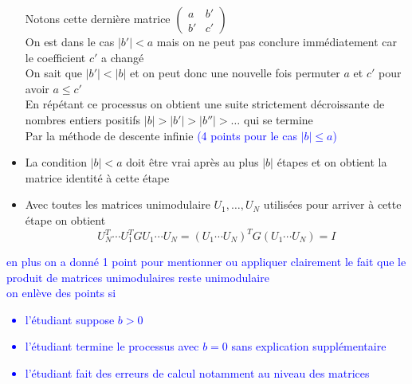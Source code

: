 \documentclass[11pt, a4paper, oneside]{article}
\newcommand{\indice}[1]{{\scriptsize \color{RubineRed} {#1}}}
\begin{document}
\begin{itemize}
Notons cette dernière matrice $\begin{pmatrix} a & b' \\ b' & c' \end{pmatrix}$ \\
\indice{On est dans le cas $|b'|<a$ mais on ne peut pas conclure immédiatement car le coefficient $c'$ a changé} \\
On sait que $|b'|<|b|$ et on peut donc une nouvelle fois permuter $a$ et $c'$ pour avoir $a\leq c'$ \\
En répétant ce processus on obtient une suite strictement décroissante de nombres entiers positifs $|b|>|b'|>|b''|> \ldots$ qui se termine \\
\indice{Par la méthode de descente infinie} \textcolor{blue}{(4 points pour le cas $|b|\leq a$)}
\item La condition $|b|<a$ doit être vrai \indice{après au plus $|b|$ étapes} et on obtient la matrice identité à cette étape
\item Avec toutes les matrices unimodulaire $U_1,\ldots,U_N$ utilisées pour arriver à cette étape on obtient
$$U_N^T\cdots U_1^TGU_1 \cdots U_N = \left(U_1\cdots U_N\right)^TG\left(U_1\cdots U_N\right) = I$$
\end{itemize}
\textcolor{blue}{en plus on a donné 1 point pour mentionner ou appliquer clairement le fait que le produit de matrices unimodulaires reste unimodulaire \\
on enlève des points si \begin{itemize} 
\item l'étudiant suppose $b>0$
\item l'étudiant termine le processus avec $b=0$ sans explication supplémentaire
\item l'étudiant fait des erreurs de calcul notamment au niveau des matrices
\end{itemize}}
\end{document}

